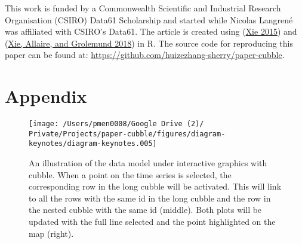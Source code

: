 \documentclass{article}
\begin{document}
This work is funded by a Commonwealth Scientific and Industrial Research Organisation (CSIRO) Data61 Scholarship and started while Nicolas Langrené was affiliated with CSIRO's Data61. The article is created using  (\protect\hyperlink{ref-knitr}{Xie 2015}) and  (\protect\hyperlink{ref-rmarkdown}{Xie, Allaire, and Grolemund 2018}) in R. The source code for reproducing this paper can be found at: \url{https://github.com/huizezhang-sherry/paper-cubble}.

\hypertarget{appendix}{%
\section{Appendix}\label{appendix}}

\begin{figure}

{\centering \texttt{[image: /Users/pmen0008/Google Drive (2)/ Private/Projects/paper-cubble/figures/diagram-keynotes/diagram-keynotes.005]} 

}

\caption{An illustration of the data model under interactive graphics with cubble. When a point on the time series is selected, the corresponding row in the long cubble will be activated. This will link to all the rows with the same id in the long cubble and the row in the nested cubble with the same id (middle). Both plots will be updated with the full line selected and the point highlighted on the map (right).}\label{fig:illu-interactive-2}
\end{figure}

\newpage
\end{document}
